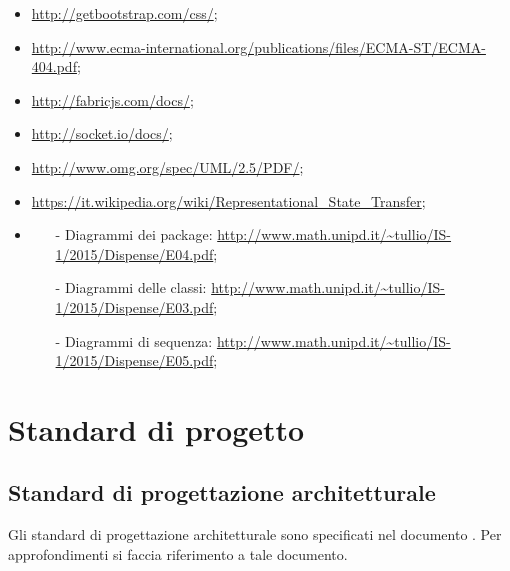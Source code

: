 \documentclass[a4paper, titlepage]{article}
\begin{document}
\begin{itemize}
	\item {} \newline \url{http://getbootstrap.com/css/};
	
	\item {} \newline \url{http://www.ecma-international.org/publications/files/ECMA-ST/ECMA-404.pdf};
	
	\item {} \newline \url{http://fabricjs.com/docs/};
	
	\item {} \newline \url{http://socket.io/docs/};
	
	\item {} \newline \url{http://www.omg.org/spec/UML/2.5/PDF/};
	
	\item {} \newline \url{https://it.wikipedia.org/wiki/Representational_State_Transfer};
	
	\item {}
		\begin{itemize}
		\item[-] Diagrammi dei package:  \newline \url{http://www.math.unipd.it/~tullio/IS-1/2015/Dispense/E04.pdf};
		\item[-] Diagrammi delle classi: \newline \url{http://www.math.unipd.it/~tullio/IS-1/2015/Dispense/E03.pdf};
		\item[-] Diagrammi di sequenza:  \newline \url{http://www.math.unipd.it/~tullio/IS-1/2015/Dispense/E05.pdf};
		\end{itemize}
		
\end{itemize}
		
	\newpage
	
	\section{Standard di progetto}
	\subsection{Standard di progettazione architetturale}
	Gli standard di progettazione architetturale sono specificati nel documento . Per approfondimenti si faccia riferimento a tale documento.
\end{document}
